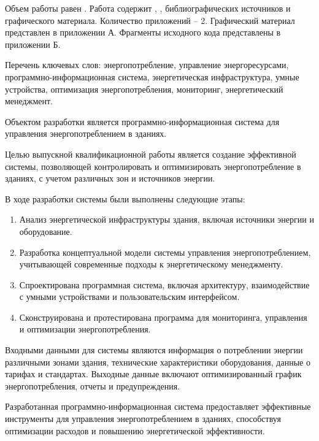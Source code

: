 
Объем работы равен . Работа содержит , ,  библиографических источников и  графического материала. Количество приложений – 2. Графический материал представлен в приложении А. Фрагменты исходного кода представлены в приложении Б.

Перечень ключевых слов: энергопотребление, управление энергоресурсами, программно-информационная система, энергетическая инфраструктура, умные устройства, оптимизация энергопотребления, мониторинг, энергетический менеджмент.

Объектом разработки является программно-информационная система для управления энергопотреблением в зданиях.

Целью выпускной квалификационной работы является создание эффективной системы, позволяющей контролировать и оптимизировать энергопотребление в зданиях, с учетом различных зон и источников энергии.

В ходе разработки системы были выполнены следующие этапы:
\begin{enumerate}
	\item Анализ энергетической инфраструктуры здания, включая источники энергии и оборудование.
	\item Разработка концептуальной модели системы управления энергопотреблением, учитывающей современные подходы к энергетическому менеджменту.
	\item Спроектирована программная система, включая архитектуру, взаимодействие с умными устройствами и пользовательским интерфейсом.
	\item Сконструирована и протестирована программа для мониторинга, управления и оптимизации энергопотребления.
\end{enumerate}

Входными данными для системы являются информация о потреблении энергии различными зонами здания, технические характеристики оборудования, данные о тарифах и стандартах. Выходные данные включают оптимизированный график энергопотребления, отчеты и предупреждения.

Разработанная программно-информационная система предоставляет эффективные инструменты для управления энергопотреблением в зданиях, способствуя оптимизации расходов и повышению энергетической эффективности.

  
